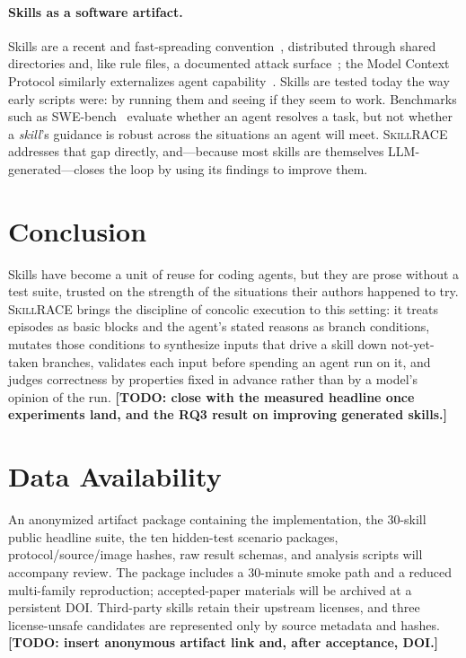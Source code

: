 \documentclass[acmsmall,screen,review,anonymous]{acmart}
\newcommand{\todo}[1]{{\color{purple}\textbf{[TODO: #1]}}}
\newcommand{\tool}{\textsc{SkillRACE}\xspace}
\begin{document}
\paragraph{Skills as a software artifact.} Skills are a recent and fast-spreading
convention~\cite{anthropic2025skills,anthropic2025skillseng}, distributed through shared
directories and, like rule files, a documented attack surface~\cite{pillar2025rules}; the
Model Context Protocol similarly externalizes agent capability~\cite{hou2025mcp}. Skills are
tested today the way early scripts were: by running them and seeing if they seem to work.
Benchmarks such as SWE-bench~\cite{jimenez2024swebench} evaluate whether an agent resolves a
task, but not whether a \emph{skill}'s guidance is robust across the situations an agent will
meet. \tool addresses that gap directly, and---because most skills are themselves
LLM-generated---closes the loop by using its findings to improve them.

\section{Conclusion}
\label{sec:conclusion}

Skills have become a unit of reuse for coding agents, but they are prose without a test
suite, trusted on the strength of the situations their authors happened to try. \tool
brings the discipline of concolic execution to this setting: it treats episodes as basic
blocks and the agent's stated reasons as branch conditions, mutates those conditions to
synthesize inputs that drive a skill down not-yet-taken branches, validates each input
before spending an agent run on it, and judges correctness by properties fixed in advance
rather than by a model's opinion of the run. \todo{close with the measured headline once
experiments land, and the RQ3 result on improving generated skills.}

\section*{Data Availability}
An anonymized artifact package containing the implementation, the 30-skill public
headline suite, the ten hidden-test scenario packages, protocol/source/image hashes,
raw result schemas, and analysis scripts will accompany review. The package includes a
30-minute smoke path and a reduced multi-family reproduction; accepted-paper materials
will be archived at a persistent DOI. Third-party skills retain their upstream licenses,
and three license-unsafe candidates are represented only by source metadata and hashes.
\todo{insert anonymous artifact link and, after acceptance, DOI.}
\end{document}
